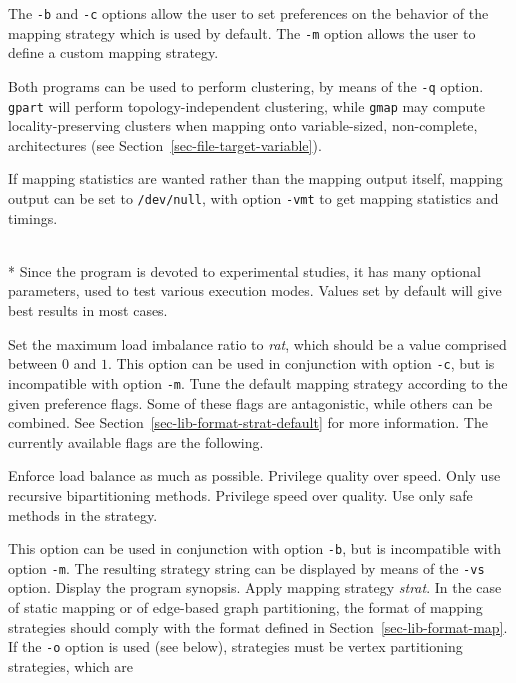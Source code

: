 \begin{itemize}
The \texttt{-b} and \texttt{-c} options allow the user to set preferences on
the behavior of the mapping strategy which is used by default. The
\texttt{-m} option allows the user to define a custom mapping strategy.

Both programs can be used to perform clustering, by means of the
\texttt{-q} option. \texttt{gpart} will perform topology-independent
clustering, while \texttt{gmap} may compute locality-preserving clusters
when mapping onto variable-sized, non-complete, architectures (see
Section~\ref{sec-file-target-variable}).

If mapping statistics are wanted rather than the mapping output itself,
mapping output can be set to \texttt{/dev/null}, with option \texttt{-vmt}
to get mapping statistics and timings.

\progopt\\*
Since the program is devoted to experimental studies, it has many
optional parameters, used to test various execution modes. Values
set by default will give best results in most cases.
\begin{itemize}
Set the maximum load imbalance ratio to \textit{rat}, which should
be a value comprised between $0$ and $1$. This option can be used in
conjunction with option \texttt{-c}, but is incompatible with option
\texttt{-m}.
Tune the default mapping strategy according to the given preference
flags. Some of these flags are antagonistic, while others can be
combined. See Section~\ref{sec-lib-format-strat-default} for more
information. The currently available flags are the following.
\begin{itemize}
\iteme[\texttt{b}]
Enforce load balance as much as possible.
\iteme[\texttt{q}]
Privilege quality over speed.
\iteme[\texttt{r}]
Only use recursive bipartitioning methods.
\iteme[\texttt{s}]
Privilege speed over quality.
\iteme[\texttt{t}]
Use only safe methods in the strategy.
\end{itemize}
This option can be used in conjunction with option \texttt{-b}, but is
incompatible with option \texttt{-m}.
The resulting strategy string can be displayed by means
of the \texttt{-vs} option.
\iteme[\texttt{-h}]
Display the program synopsis.
Apply mapping strategy {\it strat}. In the case of static mapping or
of edge-based graph partitioning, the format of mapping strategies
should comply with the format defined in
Section~\ref{sec-lib-format-map}.  If the \texttt{-o} option is used (see
below), strategies must be vertex partitioning strategies, which are

\end{itemize}
\end{itemize}

